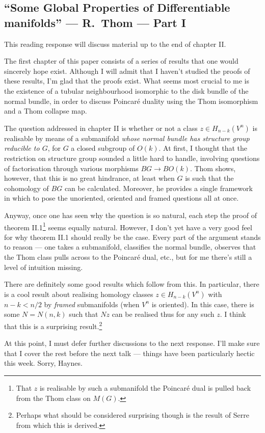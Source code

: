 \documentclass[11pt]{article}
\newcommand{\KanSemResponse}[1]
{
\thispagestyle{fancy}
\subsection*{#1}
}
\begin{document}
\begin{ThomGlobalPropertiesPartOne}
\KanSemResponse
{``Some Global Properties of Differentiable manifolds'' --- R.\ Thom --- Part I}
This reading response will discuss material up to the end of chapter II.

The first chapter of this paper consists of a series of results that one would sincerely hope exist. Although I will admit that I haven't studied the proofs of these results, I'm glad that the proofs exist. What seems most crucial to me is the existence of a tubular neighbourhood isomorphic to the disk bundle of the normal bundle, in order to discuss Poincar\'e duality using the Thom isomorphism and a Thom collapse map.

The question addressed in chapter II is whether or not a class $z\in H_{n-k}(V^n)$ is realisable by means of a submanifold \emph{whose normal bundle has structure group reducible to $G$}, for $G$ a closed subgroup of $O(k)$. At first, I thought that the restriction on structure group sounded a little hard to handle, involving questions of factorisation through various morphisms $BG\to BO(k)$. Thom shows, however, that this is no great hindrance, at least when $G$ is such that the cohomology of $BG$ can be calculated.
Moreover, he provides a single framework in which to pose the unoriented, oriented and framed questions all at once.

Anyway, once one has seen why the question is so natural, each step the proof of theorem II.1\footnote{That $z$ is realisable by such a submanifold \Iff the Poincar\'e dual is pulled back from the Thom class on $M(G)$.} seems equally natural. However, I don't yet have a very good feel for why theorem II.1 should really be the case. Every part of the argument stands to reason --- one takes a submanifold, classifies the normal bundle, observes that the Thom class pulls across to the Poincar\'e dual, etc., but for me there's still a level of intuition missing.

There are definitely some good results which follow from this. In particular, there is a cool result about realising homology classes $z\in H_{n-k}(V^n)$ with $n-k<n/2$ by \emph{framed} submanifolds (when $V^n$ is oriented). In this case, there is some $N=N(n,k)$ such that $Nz$ can be realised thus for any such $z$. I think that this is a surprising result.\footnote{Perhaps what should be considered surprising though is the result of Serre from which this is derived.}

At this point, I must defer further discussions to the next response. I'll make sure that I cover the rest before the next talk --- things have been particularly hectic this week. Sorry, Haynes.

\pagebreak
\end{ThomGlobalPropertiesPartOne}
\end{document}
